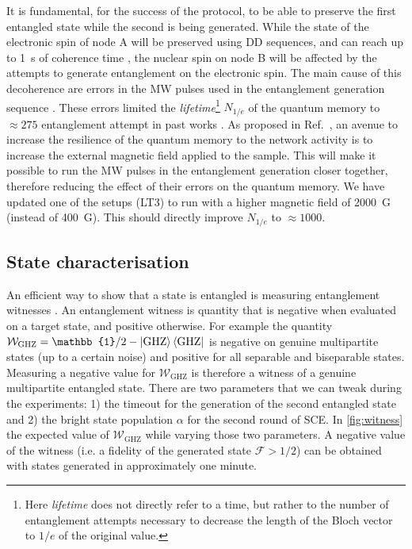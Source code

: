 \documentclass[a4paper]{article}
\begin{document}
It is fundamental, for the success of the protocol, to be able to preserve the first entangled state while the second is being generated. While the state of the electronic spin of node A will be preserved using \ac{DD} sequences, and can reach up to \SI{1}{s} of coherence time \cite{Abobeih2018}, the nuclear spin on node B will be affected by the attempts to generate entanglement on the electronic spin. The main cause of this decoherence are errors in the \ac{MW} pulses used in the entanglement generation sequence \cite{Kalb2018}. These errors limited the \emph{lifetime}\footnote{Here \emph{lifetime} does not directly refer to a time, but rather to the number of entanglement attempts necessary to decrease the length of the Bloch vector to $1/e$ of the original value.} $N_{1/e}$ of the quantum memory to $\approx 275$ entanglement attempt in past works \cite{Kalb2017}. As proposed in Ref.~\cite{Kalb2018}, an avenue to increase the resilience of the quantum memory to the network activity is to increase the external magnetic field applied to the sample. This will make it possible to run the \ac{MW} pulses in the entanglement generation closer together, therefore reducing the effect of their errors on the quantum memory. We have updated one of the setups (LT3) to run with a higher magnetic field of \SI{2000}{G} (instead of \SI{400}{G}). This should directly improve $N_{1/e}$ to $\approx 1000$.

\subsection{State characterisation}

An efficient way to show that a state is entangled is measuring entanglement witnesses \cite{Guehne2009}. An entanglement witness is quantity that is negative when evaluated on a target state, and positive otherwise. For example the quantity $\mathcal W_\text{GHZ} = \mathbb{1}/2 - \ket{\text{GHZ}}\bra{\text{GHZ}}$ is negative on genuine multipartite states (up to a certain noise) and positive for all separable and biseparable states. Measuring a negative value for $\mathcal W_\text{GHZ}$ is therefore a witness of a genuine multipartite entangled state. There are two parameters that we can tweak during the experiments: 1) the timeout for the generation of the second entangled state and 2) the bright state population $\alpha$ for the second round of \ac{SCE}. In \autoref{fig:witness} the expected value of $\mathcal W_\text{GHZ}$ while varying those two parameters. A negative value of the witness (i.e. a fidelity of the generated state $\mathcal{F} > 1/2$) can be obtained with states generated in approximately one minute.
\end{document}
